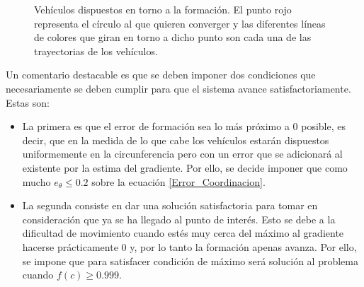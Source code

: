 \begin{figure}[H]
  \begin{center}
    \caption{Vehículos dispuestos en torno a la formación. El punto rojo representa el círculo al que quieren converger y las diferentes líneas de colores que giran en torno a dicho punto son cada una de las trayectorias de los vehículos.}
    \label{Demostracion_Coordinacion}
  \end{center}
\end{figure}
Un comentario destacable es que se deben imponer dos condiciones que necesariamente se deben cumplir para que el sistema avance satisfactoriamente. Estas son:

\begin{itemize}
	\item La primera es que el error de formación sea lo más próximo a 0 posible, es decir, que en la medida de lo que cabe los vehículos estarán dispuestos uniformemente en la circunferencia pero con un error que se adicionará al existente por la estima del gradiente. Por ello, se decide imponer que como mucho $e_{\theta}\leq{0.2}$ sobre la ecuación \ref{Error_Coordinacion}.
	\item La segunda consiste en dar una solución satisfactoria para tomar en consideración que ya se ha llegado al punto de interés. Esto se debe a la dificultad de movimiento cuando estés muy cerca del máximo al gradiente hacerse prácticamente 0 y, por lo tanto la formación apenas avanza. Por ello, se impone que para satisfacer condición de máximo será solución al problema cuando $f(c)\geq{0.999}$.
\end{itemize}

